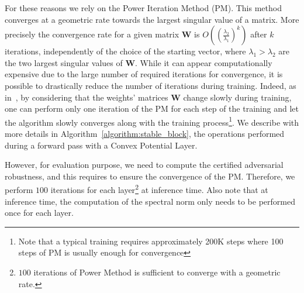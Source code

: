 For these reasons we rely on the Power Iteration Method (PM).  This method converges at a geometric rate towards the largest singular value of a matrix. More precisely the convergence rate for a given matrix $\mathbf{W}$ is $\textstyle O((\frac{\lambda_2}{\lambda_1})^k)$ after $k$ iterations, independently of the choice of the starting vector, where $\lambda_1>\lambda_2$ are the two largest singular values of $\mathbf{W}$. While it can appear computationally expensive due to the large number of required iterations for convergence, it is possible to drastically reduce the number of iterations during training. Indeed, as in~\citep{miyato2018spectral}, by considering that the weights' matrices $\mathbf{W}$ change slowly during training, one can perform only one iteration of the PM for each step of the training and let the algorithm slowly converges along with the training process\footnote{Note that a typical training requires approximately 200K steps where 100 steps of PM is usually enough for convergence}.
We describe with more details in Algorithm~\ref{algorithm:stable_block}, the operations performed during a forward pass with a Convex Potential Layer. 

However, for evaluation purpose, we need to compute the certified adversarial robustness, and this requires to ensure the convergence of the PM. Therefore, we perform $100$ iterations for each layer\footnote{$100$ iterations of Power Method is sufficient to converge with a geometric rate.} at inference time. Also note that at inference time, the computation of the spectral norm only needs to be performed once for each layer. 


